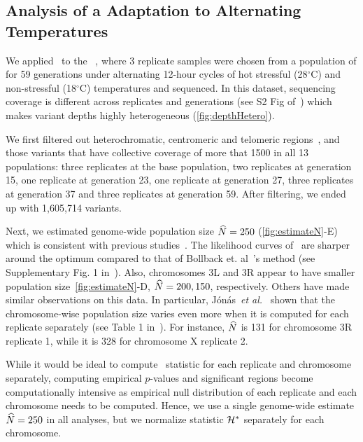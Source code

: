 \subsection{Analysis of a \dmel Adaptation to Alternating 
Temperatures}\label{sec:dmel}
We applied \comale\ to the 
\datadm~\cite{orozco2012adaptation,franssen2015patterns}, where
3 replicate samples were chosen from a population of \dmel for 59
generations under alternating 12-hour cycles of  hot stressful (28$^{\circ}$C)
and non-stressful (18$^{\circ}$C) temperatures and sequenced.  In this dataset,
sequencing coverage is different across replicates and generations
(see S2 Fig of~\cite{Terhorst2015Multi}) which makes variant depths
highly heterogeneous (\ref{fig:depthHetero}). 

We first filtered out heterochromatic, centromeric and telomeric
regions~\cite{fiston2010drosophila}, and those variants that have
collective coverage of more that 1500 in all 13 populations: three
replicates at the base population, two replicates at generation 15,
one replicate at generation 23, one replicate at generation 27, three
replicates at generation 37 and three replicates at generation
59. After filtering, we ended up with 1,605,714 variants.

Next, we estimated genome-wide population size $\widehat{N}=250$
(\ref{fig:estimateN}-E) which is consistent with previous
studies~\cite{orozco2012adaptation,jonas2016estimating}. The
likelihood curves of \comale\ are sharper around the optimum compared
to that of Bollback et. al~\cite{bollback2008estimation}'s method (see
Supplementary Fig. 1 in~\cite{orozco2012adaptation}).  Also,
chromosomes 3L and 3R appear to have smaller population
size~\ref{fig:estimateN}-D, $\widehat{N}=200,150$, respectively. 
Others have
made similar observations on this data. In particular,
J\'{o}n\'{a}s~\emph{et al.}~\cite{jonas2016estimating} shown that the 
chromosome-wise population
size varies even more when it is computed for each replicate
separately (see Table 1 in~\cite{jonas2016estimating}). For instance,
$\widehat{N}$ is 131 for chromosome 3R replicate 1, while it is 328 for chromosome X 
replicate 2.  

While it would be ideal to compute \comale\ statistic for each
replicate and chromosome separately, computing empirical $p$-values
and significant regions become computationally intensive as empirical
null distribution of each replicate and each chromosome needs to be
computed.  Hence, we use a single genome-wide estimate $\widehat{N}=250$ in
all analyses, but we normalize statistic ${\cal H}^*$ separately for each
chromosome.


